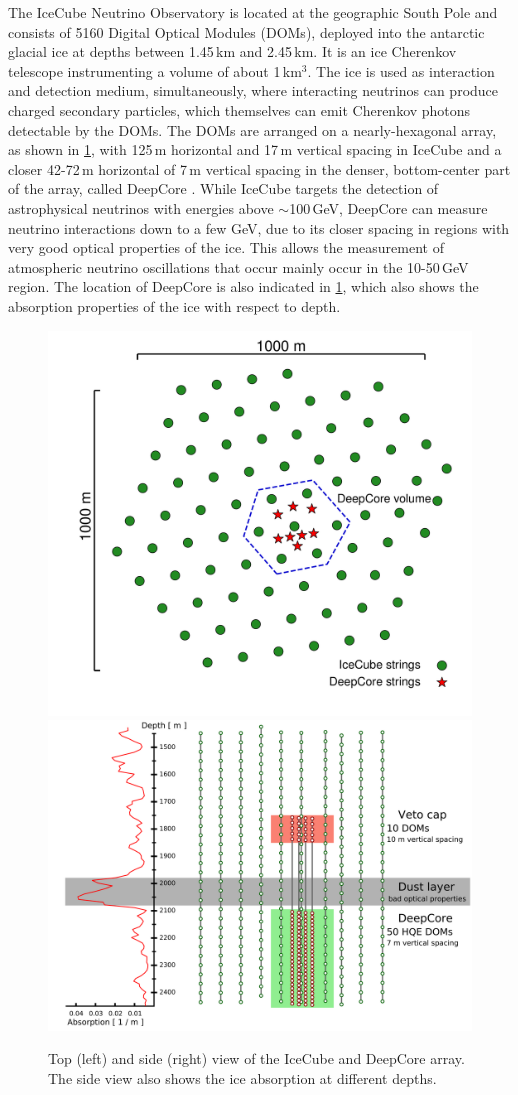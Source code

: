 \documentclass[a4paper,11pt]{article}
\begin{document}
The IceCube Neutrino Observatory \cite{Aartsen:2016nxy} is located at the geographic South Pole and consists of 5160 Digital Optical Modules (DOMs), deployed into the antarctic glacial ice at depths between 1.45\,km and 2.45\,km. It is an ice Cherenkov telescope instrumenting a volume of about 1\,km$^{3}$. The ice is used as interaction and detection medium, simultaneously, where interacting neutrinos can produce charged secondary particles, which themselves can emit Cherenkov photons detectable by the DOMs. The DOMs are arranged on a nearly-hexagonal array, as shown in \cref{fig:icecube_array}, with 125\,m horizontal and 17\,m vertical spacing in IceCube and a closer 42-72\,m horizontal of 7\,m vertical spacing in the denser, bottom-center part of the array, called DeepCore \cite{IceCube:2011ucd}. While IceCube targets the detection of astrophysical neutrinos with energies above $\sim$100\,GeV, DeepCore can measure neutrino interactions down to a few GeV, due to its closer spacing in regions with very good optical properties of the ice. This allows the measurement of atmospheric neutrino oscillations that occur mainly occur in the 10-50\,GeV region. The location of DeepCore is also indicated in \cref{fig:icecube_array}, which also shows the absorption properties of the ice with respect to depth.

\begin{figure}[h]
  \includegraphics[width=.43\linewidth]{figures/icecube_top_view_bw.pdf}
  \includegraphics[width=.52\linewidth]{figures/DeepCore_sideview.png}
  \caption{Top (left) and side (right) view of the IceCube and DeepCore array. The side view also shows the ice absorption at different depths.}
  \label{fig:icecube_array}
\end{figure}
\end{document}
